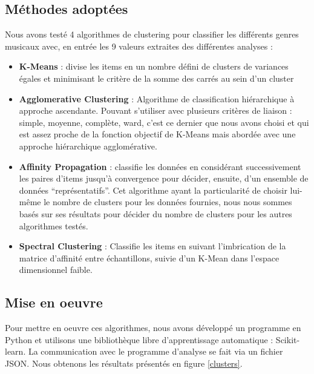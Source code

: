 \documentclass[soumission]{ir}
\begin{document}
\subsection{Méthodes adoptées}
Nous avons testé 4 algorithmes de clustering pour classifier les différents genres musicaux avec, en entrée 
les 9 valeurs extraites des différentes analyses :
\begin{itemize}
    \item{\textbf{K-Means} : divise les items en un nombre défini de clusters de variances égales et minimisant le 
    critère de la somme des carrés au sein d’un cluster}
    \item {\textbf{Agglomerative Clustering} : Algorithme de classification hiérarchique à approche ascendante. 
    Pouvant s’utiliser avec plusieurs critères de liaison : simple, moyenne, complète, ward, c’est ce dernier 
    que nous avons choisi et qui est assez proche de la fonction objectif de K-Means mais abordée avec une 
    approche hiérarchique agglomérative.}
    \item{\textbf{Affinity Propagation} : classifie les données en considérant successivement les paires d’items jusqu’à 
    convergence pour décider, ensuite, d’un ensemble de données “représentatifs”. Cet algorithme ayant la 
    particularité de choisir lui-même le nombre de clusters pour les données fournies, nous nous sommes basés 
    sur ses résultats pour décider du nombre de clusters pour les autres algorithmes testés.}
    \item{\textbf{Spectral Clustering} : Classifie les items en suivant l’imbrication de la matrice d’affinité entre 
    échantillons, suivie d’un K-Mean dans l’espace dimensionnel faible.}
\end{itemize}

\subsection{Mise en oeuvre}
Pour mettre en oeuvre ces algorithmes, nous avons développé un programme en Python et utilisons une bibliothèque 
libre d’apprentissage automatique : Scikit-learn. La communication avec le programme d’analyse se fait via un 
fichier JSON. Nous obtenons les résultats présentés en figure \ref{clusters}.
\end{document}
